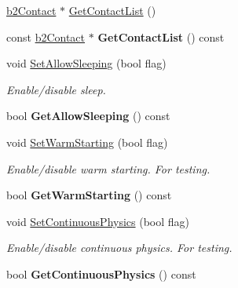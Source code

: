 \begin{DoxyCompactItemize}
\item 
\hyperlink{classb2Contact}{b2\+Contact} $\ast$ \hyperlink{classb2World_ab1e1c59fd7534c0268c2a3e31370a425}{Get\+Contact\+List} ()
\item 
\mbox{\label{classb2World_a8a947dbda196b037b922d62e6a54062f}} 
const \hyperlink{classb2Contact}{b2\+Contact} $\ast$ {\bfseries Get\+Contact\+List} () const
\item 
\mbox{\label{classb2World_a6755872564fc3db70c69d2b9d349fa33}} 
void \hyperlink{classb2World_a6755872564fc3db70c69d2b9d349fa33}{Set\+Allow\+Sleeping} (bool flag)
\begin{DoxyCompactList}\small\item\em Enable/disable sleep. \end{DoxyCompactList}\item 
\mbox{\label{classb2World_a3d7ce9b87a54fb4f84433f6223d81175}} 
bool {\bfseries Get\+Allow\+Sleeping} () const
\item 
\mbox{\label{classb2World_a8e8c12142e8c4884a18787926a261359}} 
void \hyperlink{classb2World_a8e8c12142e8c4884a18787926a261359}{Set\+Warm\+Starting} (bool flag)
\begin{DoxyCompactList}\small\item\em Enable/disable warm starting. For testing. \end{DoxyCompactList}\item 
\mbox{\label{classb2World_af23e93dbf44ebfc3c7ce9dfdc00b8ff7}} 
bool {\bfseries Get\+Warm\+Starting} () const
\item 
\mbox{\label{classb2World_a536dd9181c2e20096073e3cfe2c8530a}} 
void \hyperlink{classb2World_a536dd9181c2e20096073e3cfe2c8530a}{Set\+Continuous\+Physics} (bool flag)
\begin{DoxyCompactList}\small\item\em Enable/disable continuous physics. For testing. \end{DoxyCompactList}\item 
\mbox{\label{classb2World_afec853cfec7a8bbffc20d4acc99963e7}} 
bool {\bfseries Get\+Continuous\+Physics} () const
\item 
\mbox{\label{classb2World_ae8aacc78ea4753075067daff51b61778}} 

\end{DoxyCompactItemize}

